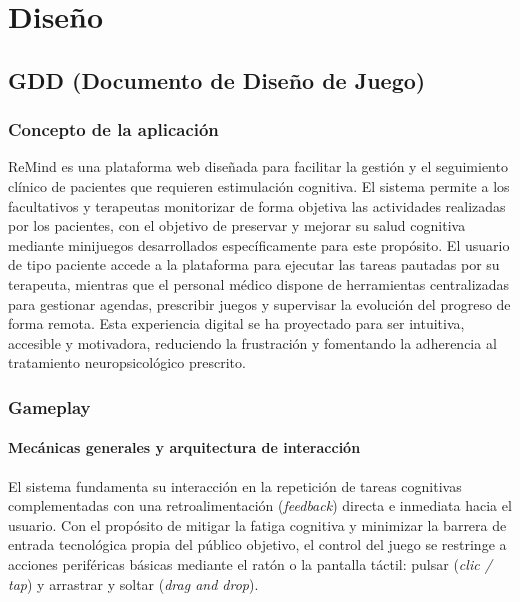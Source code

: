 \chapter{Diseño}
\section{GDD (Documento de Diseño de Juego)}

\subsection{Concepto de la aplicación}
ReMind es una plataforma web diseñada para facilitar la gestión y el seguimiento clínico de pacientes que requieren estimulación cognitiva. El sistema permite a los facultativos y terapeutas monitorizar de forma objetiva las actividades realizadas por los pacientes, con el objetivo de preservar y mejorar su salud cognitiva mediante minijuegos desarrollados específicamente para este propósito. El usuario de tipo paciente accede a la plataforma para ejecutar las tareas pautadas por su terapeuta, mientras que el personal médico dispone de herramientas centralizadas para gestionar agendas, prescribir juegos y supervisar la evolución del progreso de forma remota. Esta experiencia digital se ha proyectado para ser intuitiva, accesible y motivadora, reduciendo la frustración y fomentando la adherencia al tratamiento neuropsicológico prescrito.

\subsection{Gameplay}

\subsubsection{Mecánicas generales y arquitectura de interacción}
El sistema fundamenta su interacción en la repetición de tareas cognitivas complementadas con una retroalimentación (\textit{feedback}) directa e inmediata hacia el usuario. Con el propósito de mitigar la fatiga cognitiva y minimizar la barrera de entrada tecnológica propia del público objetivo, el control del juego se restringe a acciones periféricas básicas mediante el ratón o la pantalla táctil: pulsar (\textit{clic / tap}) y arrastrar y soltar (\textit{drag and drop}).

